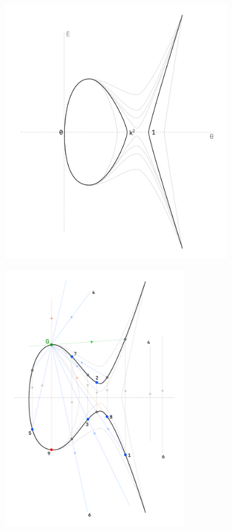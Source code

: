 \documentclass[a4paper,10pt]{article}
\begin{document}
\begin{multicols}{2}
	\noindent
	\begin{minipage}{\linewidth}
		\centering
		\includegraphics[width=97mm]{./img/ellipticCurve.png}\vspace{1mm}
		\label{fig:ec}
	\end{minipage}
	\noindent
	\begin{minipage}{\linewidth}
		\centering
		\includegraphics[width=78.25mm]{./img/ECC.png}
		\label{fig:ecc}
	\end{minipage}
\end{multicols}
\end{document}

